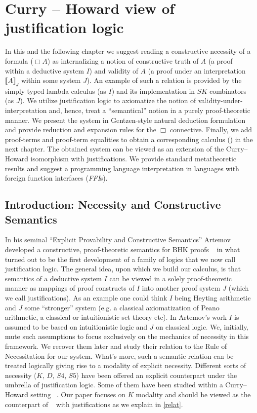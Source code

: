 \chapter{Curry -- Howard view of justification logic}
\label{proposal}
In this and the following chapter
we suggest reading a constructive necessity  
of a formula ($\Box A$) as  internalizing a notion 
of constructive truth of $A$ 
(a proof within a deductive system $I$) 
and validity of $A$
(a proof under an interpretation  $\llbracket A \rrbracket_J$ within some system $J$).  An example of such a relation is provided by the simply typed lambda calculus
(as $I$) 
and its implementation in $SK$ combinators (as $J$). 
We utilize justification logic to axiomatize the notion of 
validity-under-interpretation and, hence, 
treat  a  ``semantical'' notion in a purely
 proof-theoretic manner. We present the system  in 
Gentzen-style  natural deduction formulation  and provide reduction and expansion rules for the $\Box$ connective. Finally, we add proof-terms and proof-term equalities
to obtain a corresponding calculus ({}) in the next chapter.
The obtained system can be viewed as an extension of the Curry--Howard 
isomorphism with justifications.
We provide standard metatheoretic results  and suggest a 
programming language  interpretation in  languages with foreign function interfaces (\textit{FFI}s).

\section{Introduction: Necessity and Constructive Semantics}
In his seminal ``Explicit Provability and Constructive Semantics'' \cite{Artemov2001} 
Artemov developed a constructive, proof-theoretic semantics for 
\acs{BHK} proofs ~\cite{Troelstra1988} 
in what turned out to be the first development of a family of logics that we now call justification logic.
The general idea, upon which we build our calculus, is that semantics of a deductive system $I$ can be 
viewed in a solely proof-theoretic manner 
as mappings of proof constructs of $I$ into another proof system $J$ (which we call justifications).
As an example one could think  $I$  being  Heyting arithmetic and $J$ some  ``stronger'' system 
(e.g. a classical axiomatization of Peano arithmetic, a classical or intuitionistic set theory etc). 
 In Artemov's work $I$ is assumed to be
based on intuitionistic logic and $J$  on classical logic. 
We, initially,  mute such assumptions to focus exclusively on the mechanics of necessity in this framework.
We recover them later and study  their relation  to  the Rule of Necessitation for our system.
What's more,  such a semantic relation can be treated logically giving  rise to a modality of explicit necessity. 
Different sorts of necessity
($K$, $D$, $S4$, $S5$) have been offered  an explicit counterpart under the umbrella of justification logic. 
Some of them have been studied within a
Curry--Howard setting ~\cite{ArtBon07LFCS}. Our paper
focuses on  $K$ modality and  should be viewed as the  counterpart of ~\cite{Bellin2001} with justifications as we explain in \ref{relat}.
